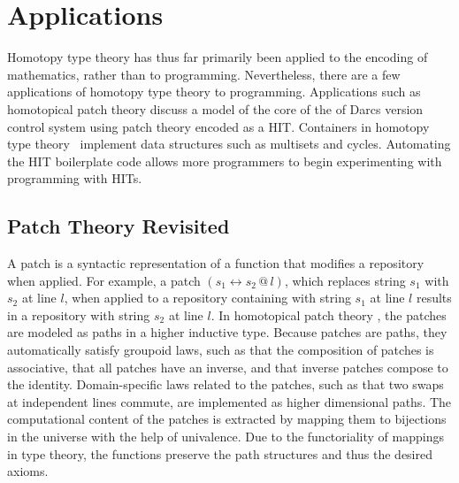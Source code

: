 \documentclass[sigplan,10pt]{acmart}
\begin{document}
\section{Applications}

Homotopy type theory has thus far primarily been applied to the encoding of mathematics, rather than to programming.
Nevertheless, there are a few  applications of homotopy type theory to programming. Applications such as homotopical patch theory \cite{Angiuli-2014} discuss a model of the core of the of Darcs \cite{Darcs-2005} version control system using patch theory \cite{Mimram-2013,Jason-2009} encoded as a HIT. Containers in homotopy type theory~\cite{Altenkirch-2014,Abbott-2005} implement data structures such as multisets and cycles. Automating the HIT boilerplate code allows more programmers to begin experimenting with programming with HITs.


\subsection{Patch Theory Revisited}
\label{patch-theory}

A patch is a syntactic representation of a function that modifies a repository when applied. For example, a patch $(s_1 \leftrightarrow s_2 \, @ \, l)$, which replaces string $s_1$ with $s_2$ at line $l$, when applied to a repository containing with string $s_1$ at line $l$ results in a repository with string $s_2$ at line $l$. In homotopical patch theory \cite{Angiuli-2014}, the patches are modeled as paths in a higher inductive type. Because patches are paths, they automatically satisfy groupoid laws, such as that the composition of patches is associative, that all patches have an inverse,  and that inverse patches compose to the identity. Domain-specific laws related to the patches, such as that two swaps at independent lines commute, are implemented as higher dimensional paths.
The computational content of the patches is extracted by mapping them to bijections in the universe with the help of univalence. Due to the functoriality of mappings in type theory, the functions preserve the path structures and thus the desired axioms.
\end{document}
